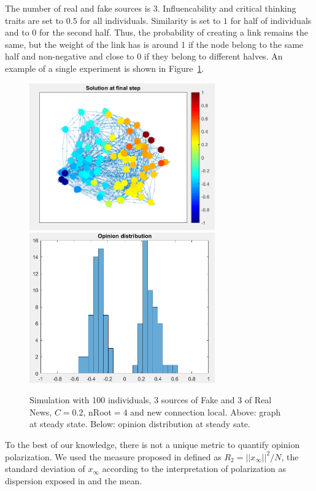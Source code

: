 The number of real and fake sources is 3. Influencability and critical thinking traits are set to $0.5$ for all individuals. Similarity is set to $1$ for half of individuals and to $0$ for the second half. Thus, the probability of creating a link remains the same, but the weight of the link has is around 1 if the node belong to the same half and non-negative and close to 0 if they belong to different halves. An example of a single experiment is shown in Figure~\ref{pics:exp20}.\\

\begin{figure}[!t]
\centering
\includegraphics[width=8cm]{Figures/Exp20_graph.png}
\includegraphics[width=8cm]{Figures/Exp20_hyst.png}
\caption{Simulation with 100 individuals, 3 sources of Fake and 3 of Real News, $C=0.2$, nRoot$=4$ and new connection local. Above: graph at steady state. Below: opinion distribution at steady sate.}
\label{pics:exp20}
\end{figure}

To the best of our knowledge, there is not a unique metric to quantify opinion polarization. We used the measure proposed in \cite{Matakos2017} defined as $R_2 = ||x_{\infty}||^2/ N$, the standard deviation of $x_{\infty}$ according to the interpretation of polarization as dispersion exposed in \cite{Bramsona2016} and the mean.\\

